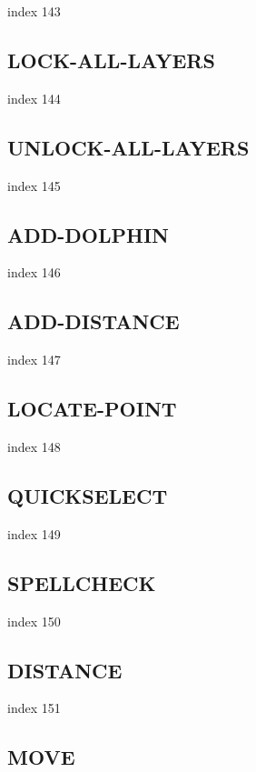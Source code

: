 \documentclass[a4paper]{report}
\begin{document}
index 143

\subsection{LOCK-ALL-LAYERS}

index 144

\subsection{UNLOCK-ALL-LAYERS}

index 145

\subsection{ADD-DOLPHIN}

index 146

\subsection{ADD-DISTANCE}

index 147

\subsection{LOCATE-POINT}

index 148

\subsection{QUICKSELECT}

index 149

\subsection{SPELLCHECK}

index 150

\subsection{DISTANCE}

index 151

\subsection{MOVE}
\end{document}
